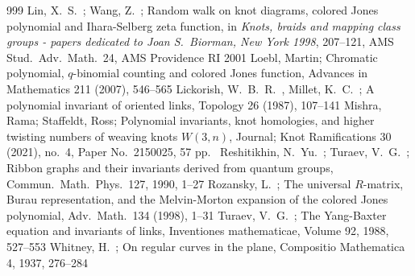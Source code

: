 \documentclass[11pt]{article}
\theoremstyle{definition}
\theoremstyle{remark}
\theoremstyle{remark}
\begin{document}
\begin{small}
\begin{thebibliography}{999}
 Lin, X.\ S.\ ; Wang, Z.\ ; Random walk on knot diagrams, colored Jones polynomial and Ihara-Selberg zeta function, in \textit{Knots, braids and mapping class groups - papers dedicated to Joan S.\ Biorman, New York 1998}, 207--121, AMS Stud.\ Adv.\ Math.\ 24, AMS Providence RI 2001
 Loebl, Martin; Chromatic polynomial, $q$-binomial counting and colored Jones function, Advances in Mathematics 211 (2007), 546--565
 Lickorish, W.\ B.\ R.\ , Millet, K.\ C.\ ; A polynomial invariant of oriented links, Topology 26 (1987), 107--141
 Mishra, Rama; Staffeldt, Ross; Polynomial invariants, knot homologies, and higher twisting numbers of weaving knots $W(3,n)$, Journal; Knot Ramifications 30 (2021), no.\ 4, Paper No.\ 2150025, 57 pp.\
 Reshitikhin, N.\ Yu.\ ; Turaev, V.\ G.\ ; Ribbon graphs and their invariants derived from quantum groups, Commun.\ Math.\ Phys.\ 127, 1990, 1--27
\bibitem{R} Rozansky, L.\ ; The universal $R$-matrix, Burau representation, and the Melvin-Morton expansion of the colored Jones polynomial, Adv.\ Math.\ 134 (1998), 1--31
\bibitem{T} Turaev, V.\ G.\ ; The Yang-Baxter equation and invariants of links, Inventiones mathematicae, Volume 92, 1988, 527--553
\bibitem{W} Whitney, H.\ ; On regular curves in the plane, Compositio Mathematica 4, 1937, 276--284
\end{thebibliography}
\end{small}
\end{document}
